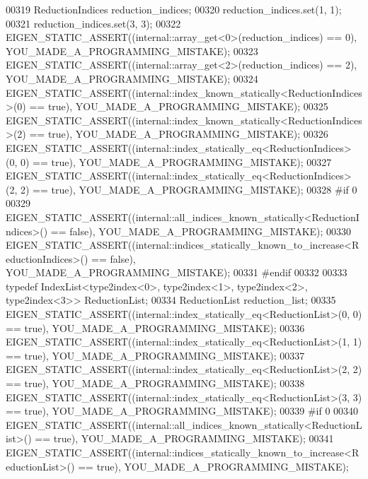 \begin{DoxyCode}
00319   ReductionIndices reduction\_indices;
00320   reduction\_indices.set(1, 1);
00321   reduction\_indices.set(3, 3);
00322   EIGEN\_STATIC\_ASSERT((internal::array\_get<0>(reduction\_indices) == 0), YOU\_MADE\_A\_PROGRAMMING\_MISTAKE);
00323   EIGEN\_STATIC\_ASSERT((internal::array\_get<2>(reduction\_indices) == 2), YOU\_MADE\_A\_PROGRAMMING\_MISTAKE);
00324   EIGEN\_STATIC\_ASSERT((internal::index\_known\_statically<ReductionIndices>(0) == \textcolor{keyword}{true}), 
      YOU\_MADE\_A\_PROGRAMMING\_MISTAKE);
00325   EIGEN\_STATIC\_ASSERT((internal::index\_known\_statically<ReductionIndices>(2) == \textcolor{keyword}{true}), 
      YOU\_MADE\_A\_PROGRAMMING\_MISTAKE);
00326   EIGEN\_STATIC\_ASSERT((internal::index\_statically\_eq<ReductionIndices>(0, 0) == \textcolor{keyword}{true}), 
      YOU\_MADE\_A\_PROGRAMMING\_MISTAKE);
00327   EIGEN\_STATIC\_ASSERT((internal::index\_statically\_eq<ReductionIndices>(2, 2) == \textcolor{keyword}{true}), 
      YOU\_MADE\_A\_PROGRAMMING\_MISTAKE);
00328 \textcolor{preprocessor}{#if 0}
00329   EIGEN\_STATIC\_ASSERT((internal::all\_indices\_known\_statically<ReductionIndices>() == \textcolor{keyword}{false}), 
      YOU\_MADE\_A\_PROGRAMMING\_MISTAKE);
00330   EIGEN\_STATIC\_ASSERT((internal::indices\_statically\_known\_to\_increase<ReductionIndices>() == \textcolor{keyword}{false}), 
      YOU\_MADE\_A\_PROGRAMMING\_MISTAKE);
00331 \textcolor{preprocessor}{#endif}
00332 
00333   \textcolor{keyword}{typedef} IndexList<type2index<0>, type2index<1>, type2index<2>, type2index<3>> ReductionList;
00334   ReductionList reduction\_list;
00335   EIGEN\_STATIC\_ASSERT((internal::index\_statically\_eq<ReductionList>(0, 0) == \textcolor{keyword}{true}), 
      YOU\_MADE\_A\_PROGRAMMING\_MISTAKE);
00336   EIGEN\_STATIC\_ASSERT((internal::index\_statically\_eq<ReductionList>(1, 1) == \textcolor{keyword}{true}), 
      YOU\_MADE\_A\_PROGRAMMING\_MISTAKE);
00337   EIGEN\_STATIC\_ASSERT((internal::index\_statically\_eq<ReductionList>(2, 2) == \textcolor{keyword}{true}), 
      YOU\_MADE\_A\_PROGRAMMING\_MISTAKE);
00338   EIGEN\_STATIC\_ASSERT((internal::index\_statically\_eq<ReductionList>(3, 3) == \textcolor{keyword}{true}), 
      YOU\_MADE\_A\_PROGRAMMING\_MISTAKE);
00339 \textcolor{preprocessor}{#if 0}
00340   EIGEN\_STATIC\_ASSERT((internal::all\_indices\_known\_statically<ReductionList>() == \textcolor{keyword}{true}), 
      YOU\_MADE\_A\_PROGRAMMING\_MISTAKE);
00341   EIGEN\_STATIC\_ASSERT((internal::indices\_statically\_known\_to\_increase<ReductionList>() == \textcolor{keyword}{true}), 
      YOU\_MADE\_A\_PROGRAMMING\_MISTAKE);

\end{DoxyCode}
